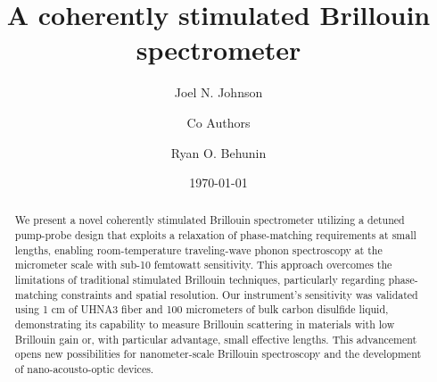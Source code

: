 \documentclass[%
  reprint,
  superscriptaddress,
  amsmath,amssymb,
  aps,
  prapplied,
]{revtex4-2}
\begin{document}

\title{A coherently stimulated Brillouin spectrometer}

\author{Joel N. Johnson}

\author{Co Authors}

\author{Ryan O. Behunin}

\date{\today}

\begin{abstract}
We present a novel coherently stimulated Brillouin spectrometer utilizing a detuned pump-probe design that exploits a relaxation of phase-matching requirements at small lengths, enabling room-temperature traveling-wave phonon spectroscopy at the micrometer scale with sub-10 femtowatt sensitivity. This approach overcomes the limitations of traditional stimulated Brillouin techniques, particularly regarding phase-matching constraints and spatial resolution. Our instrument's sensitivity was validated using 1 cm of UHNA3 fiber and 100 micrometers of bulk carbon disulfide liquid, demonstrating its capability to measure Brillouin scattering in materials with low Brillouin gain or, with particular advantage, small effective lengths. This advancement opens new possibilities for nanometer-scale Brillouin spectroscopy and the development of nano-acousto-optic devices.

\end{abstract}

\end{document}
